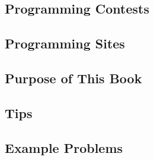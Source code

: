 \subsection{Programming Contests}


\subsection{Programming Sites}
\subsection{Purpose of This Book}
\subsection{Tips}
\subsection{Example Problems}